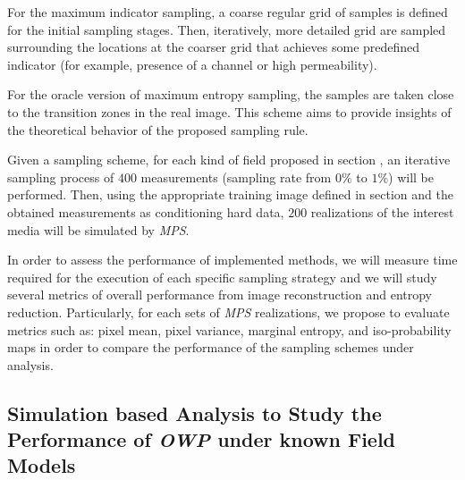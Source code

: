 For the maximum indicator sampling, a coarse regular grid of samples is defined for the initial sampling stages. Then, iteratively, more detailed grid are sampled surrounding the locations at the coarser grid that achieves some predefined indicator (for example, presence of a channel or high permeability).

For the oracle version of maximum entropy sampling, the samples are taken close to the transition zones in the real image. This scheme aims to provide insights of the theoretical behavior of the proposed sampling rule. 

Given a sampling scheme, for each kind of field proposed in section \label{sec_DB_Gen}, an iterative sampling process of $400$ measurements (sampling rate from $0 \%$ to $1 \%$) will be performed. Then, using the appropriate training image defined in section \label{sec_DB_Gen} and the obtained measurements as conditioning hard data, $200$ realizations of the interest media will be simulated by \emph{MPS}.

In order to assess the performance of implemented methods, we will measure time required for the execution of each specific sampling strategy and we will study several metrics of overall performance from image reconstruction and entropy reduction. Particularly, for each sets of \emph{MPS} realizations, we propose to evaluate metrics such as: pixel mean, pixel variance, marginal entropy, and iso-probability maps in order to compare the performance of the sampling schemes under analysis.


\subsection{Simulation based Analysis to Study the Performance of \emph{OWP} under known Field Models}

